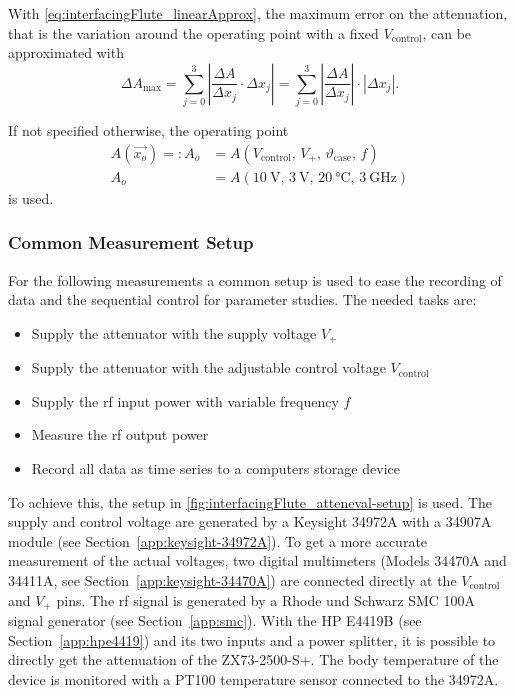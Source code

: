 With \autoref{eq:interfacingFlute_linearApprox}, the maximum error on the attenuation, that is the variation around the operating point with a fixed $V_\text{control}$, can be approximated with
\begin{equation}\label{eq:interfacingFlute_maxerror}
\Delta A_{\text{max}} = \sum_{j=0}^{3} \left|\frac{\Delta A}{\Delta x_j} \cdot \Delta x_j\right| 
= \sum_{j=0}^{3} \left|\frac{\Delta A}{\Delta x_j}\right| \cdot \left|\Delta x_j\right|.
\end{equation}

If not specified otherwise, the operating point
\begin{align}\label{eq:interfacingFlute_operatingpoint}
A(\vec{x_o}) =: A_o &= A(V_\text{control},\,V_+,\,\vartheta_\text{case},\,f)\\
A_o                 &= A\left(\SI{10}{\volt},\,\SI{3}{\volt},\,\SI{20}{\celsius},\,\SI{3}{\GHz}\right)
\end{align}
is used.

\subsubsection{Common Measurement Setup}
For the following measurements a common setup is used to ease the recording of data and the sequential control for parameter studies. The needed tasks are:
\begin{itemize}
\item Supply the attenuator with the supply voltage $V_+$
\item Supply the attenuator with the adjustable control voltage $V_\text{control}$
\item Supply the \gls{rf} input power with variable frequency $f$
\item Measure the \gls{rf} output power
\item Record all data as time series to a computers storage device
\end{itemize}

To achieve this, the setup in \autoref{fig:interfacingFlute_atteneval-setup} is used.
The supply and control voltage are generated by a Keysight 34972A with a 34907A module (see Section~\ref{app:keysight-34972A}).
To get a more accurate measurement of the actual voltages, two digital multimeters (Models 34470A and 34411A, see Section~\ref{app:keysight-34470A}) are connected directly at the $V_\text{control}$ and $V_+$ pins.
The \gls{rf} signal is generated by a Rhode und Schwarz SMC 100A signal generator (see Section~\ref{app:smc}).
With the HP E4419B (see Section~\ref{app:hpe4419}) and its two inputs and a power splitter, it is possible to directly get the attenuation of the ZX73-2500-S+.
The body temperature of the device is monitored with a PT100 temperature sensor connected to the 34972A.

